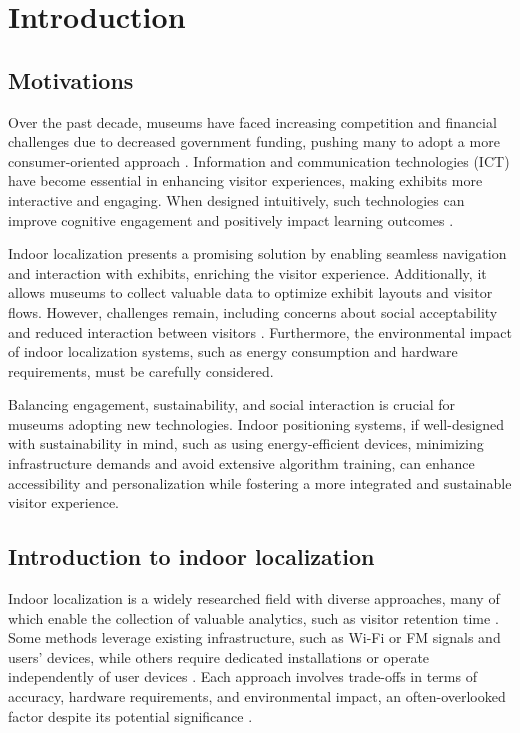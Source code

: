 \chapter{Introduction}
\label{chap:introduction}

\section{Motivations}



Over the past decade, museums have faced increasing competition and financial challenges due to decreased government funding, pushing many to adopt a more consumer-oriented approach \cite{chiappa_emotions_2014}. Information and communication technologies (ICT) have become essential in enhancing visitor experiences, making exhibits more interactive and engaging. When designed intuitively, such technologies can improve cognitive engagement and positively impact learning outcomes \cite{pallud_impact_2017}.   

Indoor localization presents a promising solution by enabling seamless navigation and interaction with exhibits, enriching the visitor experience. Additionally, it allows museums to collect valuable data to optimize exhibit layouts and visitor flows. However, challenges remain, including concerns about social acceptability and reduced interaction between visitors \cite{tom_dieck_enhancing_2018}. Furthermore, the environmental impact of indoor localization systems, such as energy consumption and hardware requirements, must be carefully considered.

Balancing engagement, sustainability, and social interaction is crucial for museums adopting new technologies. Indoor positioning systems, if well-designed with sustainability in mind, such as using energy-efficient devices, minimizing infrastructure demands and avoid extensive algorithm training, can enhance accessibility and personalization while fostering a more integrated and sustainable visitor experience.

\section{Introduction to indoor localization}


Indoor localization is a widely researched field with diverse approaches, many of which enable the collection of valuable analytics, such as visitor retention time \cite{spachos_ble_2020}. Some methods leverage existing infrastructure, such as Wi-Fi or FM signals and users' devices, while others require dedicated installations or operate independently of user devices \cite{ali_locali_2017}. Each approach involves trade-offs in terms of accuracy, hardware requirements, and environmental impact, an often-overlooked factor despite its potential significance \cite{mainetti_survey_2014}.   

